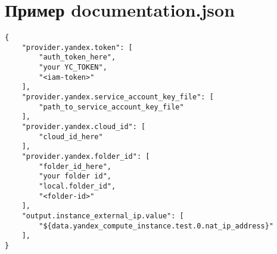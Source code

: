﻿\chapter{Пример documentation.json}\label{sec:appendix4}

\begin{verbatim}
{
    "provider.yandex.token": [
        "auth_token_here",
        "your YC_TOKEN",
        "<iam-token>"
    ],
    "provider.yandex.service_account_key_file": [
        "path_to_service_account_key_file"
    ],
    "provider.yandex.cloud_id": [
        "cloud_id_here"
    ],
    "provider.yandex.folder_id": [
        "folder_id_here",
        "your folder id",
        "local.folder_id",
        "<folder-id>"
    ],
    "output.instance_external_ip.value": [
        "${data.yandex_compute_instance.test.0.nat_ip_address}"
    ],
}
\end{verbatim}
